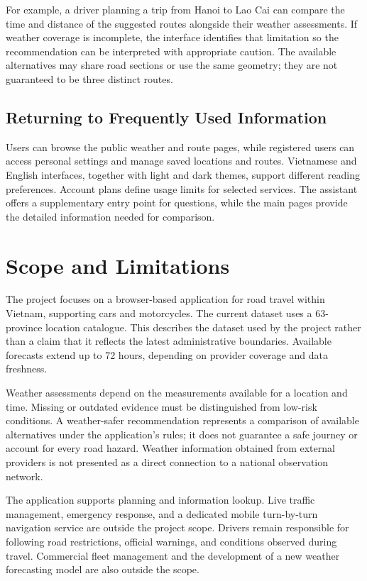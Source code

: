 For example, a driver planning a trip from Hanoi to Lao Cai can compare the time and distance of the suggested routes alongside their weather assessments. If weather coverage is incomplete, the interface identifies that limitation so the recommendation can be interpreted with appropriate caution. The available alternatives may share road sections or use the same geometry; they are not guaranteed to be three distinct routes.

\subsection{Returning to Frequently Used Information}
Users can browse the public weather and route pages, while registered users can access personal settings and manage saved locations and routes. Vietnamese and English interfaces, together with light and dark themes, support different reading preferences. Account plans define usage limits for selected services. The assistant offers a supplementary entry point for questions, while the main pages provide the detailed information needed for comparison.

\section{Scope and Limitations}
The project focuses on a browser-based application for road travel within Vietnam, supporting cars and motorcycles. The current dataset uses a 63-province location catalogue. This describes the dataset used by the project rather than a claim that it reflects the latest administrative boundaries. Available forecasts extend up to 72 hours, depending on provider coverage and data freshness.

Weather assessments depend on the measurements available for a location and time. Missing or outdated evidence must be distinguished from low-risk conditions. A weather-safer recommendation represents a comparison of available alternatives under the application's rules; it does not guarantee a safe journey or account for every road hazard. Weather information obtained from external providers is not presented as a direct connection to a national observation network.

The application supports planning and information lookup. Live traffic management, emergency response, and a dedicated mobile turn-by-turn navigation service are outside the project scope. Drivers remain responsible for following road restrictions, official warnings, and conditions observed during travel. Commercial fleet management and the development of a new weather forecasting model are also outside the scope.

